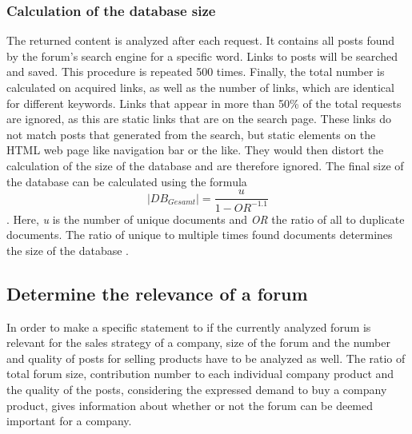 \subsubsection{Calculation of the database size}
The returned content is analyzed after each request. It contains all posts found by the forum's search engine for a specific word. Links to posts will be searched and saved. This procedure is repeated 500 times. Finally, the total number is calculated on acquired links, as well as the number of links, which are identical for different keywords. Links that appear in more than 50\% of the total requests are ignored, as this are static links that are on the search page. These links do not match posts that  generated from the search, but static elements on the HTML web page like navigation bar or the like. They would then distort the calculation of the size of the database and are therefore ignored. The final size of the database can be calculated using the formula
\[|DB_{Gesamt}| = \frac{u}{1-OR^{-1.1}}\]. Here, \textit{u} is the number of unique documents and \textit{OR} the ratio of all to duplicate documents.
The ratio of unique to multiple times found documents determines the size of the database \cite{lu2008efficient}.\\



\subsection{Determine the relevance of a forum}
In order to make a specific statement to if the currently analyzed forum is relevant for the sales strategy of a company, size of the forum and the number and quality of posts for selling products have to be analyzed as well. The ratio of total forum size, contribution number to each individual company product and the quality of the posts, considering the expressed demand to buy a company product, gives information about whether or not the forum can be deemed important for a company.

